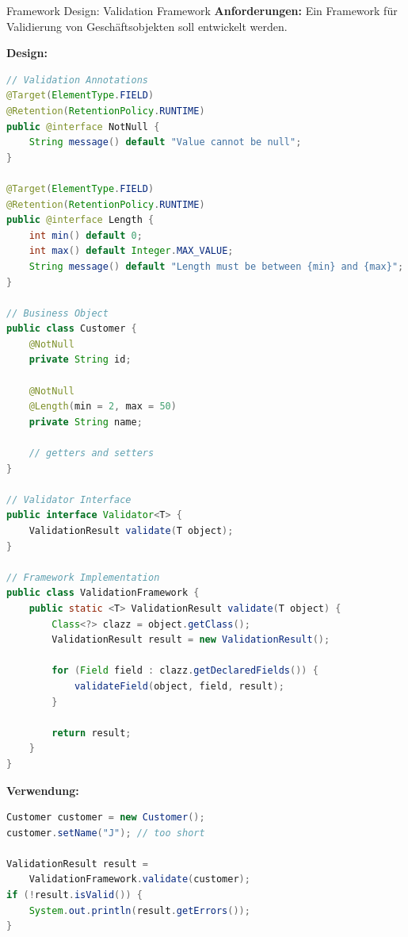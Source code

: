 \begin{example2}{Framework Design: Validation Framework}
\textbf{Anforderungen:}
Ein Framework für Validierung von Geschäftsobjekten soll entwickelt werden.

\textbf{Design:}
\begin{lstlisting}[language=Java, style=base]
// Validation Annotations
@Target(ElementType.FIELD)
@Retention(RetentionPolicy.RUNTIME)
public @interface NotNull {
    String message() default "Value cannot be null";
}

@Target(ElementType.FIELD)
@Retention(RetentionPolicy.RUNTIME)
public @interface Length {
    int min() default 0;
    int max() default Integer.MAX_VALUE;
    String message() default "Length must be between {min} and {max}";
}

// Business Object
public class Customer {
    @NotNull
    private String id;
    
    @NotNull
    @Length(min = 2, max = 50)
    private String name;
    
    // getters and setters
}

// Validator Interface
public interface Validator<T> {
    ValidationResult validate(T object);
}

// Framework Implementation
public class ValidationFramework {
    public static <T> ValidationResult validate(T object) {
        Class<?> clazz = object.getClass();
        ValidationResult result = new ValidationResult();
        
        for (Field field : clazz.getDeclaredFields()) {
            validateField(object, field, result);
        }
        
        return result;
    }
}
\end{lstlisting}

\textbf{Verwendung:}
\begin{lstlisting}[language=Java, style=base]
Customer customer = new Customer();
customer.setName("J"); // too short

ValidationResult result = 
    ValidationFramework.validate(customer);
if (!result.isValid()) {
    System.out.println(result.getErrors());
}
\end{lstlisting}
\end{example2}

